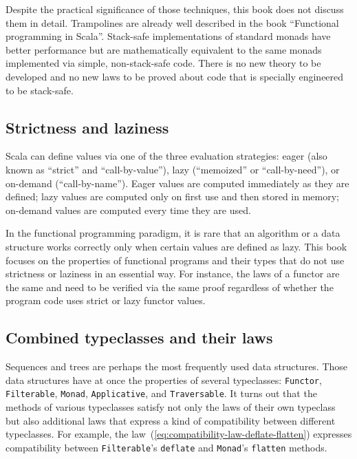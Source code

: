 Despite the practical significance of those techniques, this book
does not discuss them in detail. Trampolines are already well described
in the book \textsf{``}Functional programming in Scala\textsf{''}. Stack-safe implementations
of standard monads have better performance but are mathematically
equivalent to the same monads implemented via simple, non-stack-safe
code. There is no new theory to be developed and no new laws to be
proved about code that is specially engineered to be stack-safe.

\subsection{Strictness and laziness}

Scala can define values via one of the three evaluation strategies:
eager (also known as \textsf{``}strict\textsf{''} and \textsf{``}call-by-value\textsf{''}), lazy (\textsf{``}memoized\textsf{''}
or \textsf{``}call-by-need\textsf{''}), or on-demand (\textsf{``}call-by-name\textsf{''}). Eager values
are computed immediately as they are defined; lazy values are computed
only on first use and then stored in memory; on-demand values are
computed every time they are used. 

In the functional programming paradigm, it is rare that an algorithm
or a data structure works correctly only when certain values are defined
as lazy. This book focuses on the properties of functional programs
and their types that do not use strictness or laziness in an essential
way. For instance, the laws of a functor are the same and need to
be verified via the same proof regardless of whether the program code
uses strict or lazy functor values. 

\subsection{Combined typeclasses and their laws}

Sequences and trees are perhaps the most frequently used data structures.
Those data structures have at once the properties of several typeclasses:
\lstinline!Functor!, \lstinline!Filterable!, \lstinline!Monad!,
\lstinline!Applicative!, and \lstinline!Traversable!. It turns out
that the methods of various typeclasses satisfy not only the laws
of their own typeclass but also additional laws that express a kind
of compatibility between different typeclasses. For example, the law~(\ref{eq:compatibility-law-deflate-flatten})
expresses compatibility between \lstinline!Filterable!\textsf{'}s \lstinline!deflate!
and \lstinline!Monad!\textsf{'}s \lstinline!flatten! methods.

